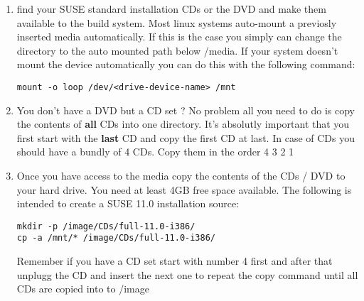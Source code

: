 \begin{enumerate}
\item find your SUSE standard installation CDs or the DVD and
      make them available to the build system. Most linux systems
      auto-mount a previosly inserted media automatically. If this
      is the case you simply can change the directory to the
      auto mounted path below /media. If your system doesn't mount
      the device automatically you can do this with the following
      command:

\begin{Command}{12cm}
\begin{verbatim}
mount -o loop /dev/<drive-device-name> /mnt
\end{verbatim}
\end{Command}

\item You don't have a DVD but a CD set ? No problem all you need to
      do is copy the contents of \textbf{all} CDs into one directory. It's
      absolutly important that you first start with the \textbf{last} CD and
      copy the first CD at last. In case of CDs you should have a
      bundly of 4 CDs. Copy them in the order 4 3 2 1

\item Once you have access to the media copy the contents of the
      CDs / DVD to your hard drive. You need at least 4GB free
      space available. The following is intended to create a SUSE
      11.0 installation source:

\begin{Command}{12cm}
\begin{verbatim}
mkdir -p /image/CDs/full-11.0-i386/
cp -a /mnt/* /image/CDs/full-11.0-i386/
\end{verbatim}
\end{Command}

      Remember if you have a CD set start with number 4 first and
      after that unplugg the CD and insert the next one to repeat
      the copy command until all CDs are copied into to /image
\end{enumerate}

